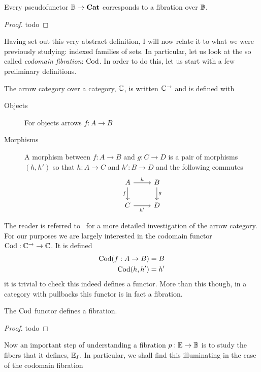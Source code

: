 \begin{thm}\label{thm:fibrations:grothendieckconstruction}
  Every pseudofunctor $\mathbb{B} \to \mathbf{Cat}$ corresponds to a fibration
  over $\mathbb{B}$.
\end{thm}
\begin{proof}
  todo
\end{proof}

Having set out this very abstract definition, I will now relate it to
what we were previously studying: indexed families of sets. In
particular, let us look at the so called \emph{codomain fibration}:
$\operatorname{Cod}$. In order to do this, let us start with a few preliminary
definitions.

\begin{defn}\label{defn:fibrations:arrowcat}
  The arrow category over a category, $\mathbb{C}$, is written
  $\mathbb{C}^{\to}$ and is defined with
  \begin{description}
  \item[Objects] For objects arrows $f : A \to B$
  \item[Morphisms] A morphism between $f : A \to B$ and $g : C \to D$
    is a pair of morphisms $(h, h')$ so that $h : A \to C$ and $h' : B
    \to D$ and the following commutes
    \[
      \begin{tikzcd}
        A \ar[d, "f", swap] \ar[r, "h"] & B \ar[d, "g"]\\
        C \ar[r, "h'", swap] & D
      \end{tikzcd}
    \]
  \end{description}
\end{defn}

The reader is referred to~\citet{MacLane:98} for a more detailed
investigation of the arrow category. For our purposes we are largely
interested in the codomain functor $\operatorname{Cod} : \mathbb{C}^{\to} \to
\mathbb{C}$. It is defined
\begin{align*}
  \operatorname{Cod}(f : A \to B) &= B\\
  \operatorname{Cod}(h, h') &= h'
\end{align*}
it is trivial to check this indeed defines a functor. More than this
though, in a category with pullbacks this functor is in fact a
fibration.
\begin{example}\label{example:fibrations:cod}
  The $\operatorname{Cod}$ functor defines a fibration.
\end{example}
\begin{proof}
  todo
\end{proof}

Now an important step of understanding a fibration
$p : \mathbb{E} \to \mathbb{B}$ is to study the fibers that it defines,
$\mathbb{E}_I$. In particular, we shall find this illuminating in the case
of the codomain fibration

